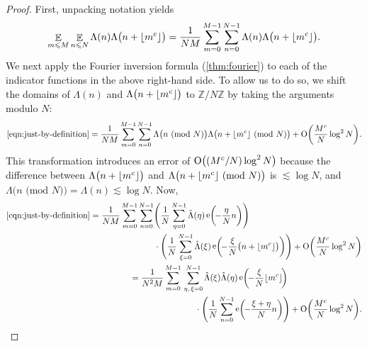 \documentclass[letterpaper, 12pt]{article}
\theoremstyle{plain}
\theoremstyle{definition}
\theoremstyle{plain}
\theoremstyle{plain}
\numberwithin{equation}{section}
\newcommand{\Oh}{{\rm O}}
\newcommand{\Z}{\mathbb{Z}}
\renewcommand{\leq}{\leqslant}
\newcommand{\E}{\mathbb{E}}
\newcommand{\1}{\textbf{1}}
\DeclarePairedDelimiter\floor{\lfloor}{\rfloor}
\DeclareMathOperator{\e}{e}
\begin{document}
\begin{proof} First, unpacking notation yields
    \begin{equation}\label{eqn:just-by-definition}
        \mathop{\E}_{m \leq M} \mathop{\E}_{n \leq N} \Lambda(n) \Lambda\bigl(n + \floor{m^c} \bigr)
        = \frac{1}{NM} \sum_{m = 0}^{M - 1} \sum_{n = 0}^{N - 1} \Lambda(n) \Lambda\bigl(n + \floor{m^c} \bigr).
    \end{equation}
        We next apply the Fourier inversion formula (\cref{thm:fourier}) to each of the indicator functions in the above right-hand side. To allow us to do so, we shift the domains of \(\Lambda(n)\) and \(\Lambda\bigl(n + \floor{m^c} \bigr)\) to \(\Z/N\Z\) by taking the arguments modulo \(N\):
    \begin{equation*}
        \eqref{eqn:just-by-definition} = \frac{1}{NM} \sum_{m = 0}^{M - 1} \sum_{n = 0}^{N - 1} \Lambda\bigl(n \text{ (mod } N) \bigr) \Lambda\bigl(n + \floor{m^c} \text{ (mod } N)\bigr) + \Oh \biggl(\frac{M^c}{N} \log^2{N} \biggr).
    \end{equation*}
    This transformation introduces an error of \(\Oh \bigl((M^c/N)\log^2{N} \bigr)\) because the difference between \(\Lambda\bigl(n + \floor{m^c} \bigr)\) and \(\Lambda\bigl(n + \floor{m^c} \text{ (mod } N) \bigr)\) is $\lesssim \log N$, and $\Lambda\bigl(n\text{ (mod } N) \bigr) = \Lambda(n) \lesssim \log N$.
    Now,
    \begin{align*}
        \begin{split}
            \eqref{eqn:just-by-definition} &= \frac{1}{NM} \sum_{m = 0}^{M - 1} \sum_{n = 0}^{N - 1} \Biggl(\frac{1}{N} \sum_{\eta = 0}^{N - 1} \hat{\Lambda}(\eta) \e\biggl(\! -\frac{\eta}{N} n \biggr) \Biggr)\\
            &\hphantom{= \frac{1}{NM} \sum_{m = 0}^{M - 1} \sum_{n = 0}^{N - 1}}\ 
            \cdot \Biggl(\frac{1}{N} \sum_{\xi = 0}^{N - 1} \hat{\Lambda}(\xi) \e\biggl(\! -\frac{\xi}{N} \bigl(n + \floor{m^c} \bigr) \biggr) \Biggr) + \Oh \biggl(\frac{M^c}{N}\log^2{N} \biggr)
        \end{split}\\
        \begin{split}
            &= \frac{1}{N^2M} \sum_{m = 0}^{M - 1} \, \sum_{\eta,\, \xi = 0}^{N - 1} \hat{\Lambda}(\xi)\hat{\Lambda}(\eta) \e\biggl(\! -\frac{\xi}{N} \floor{m^c} \!\biggr)\\
            &\hphantom{= \frac{1}{NM} \sum_{m = 0}^{M - 1} \, \sum_{n = 0}^{N - 1}}\ 
            \cdot \Biggl(\frac{1}{N} \sum_{n = 0}^{N - 1} \e\biggl(\! -\frac{\xi + \eta}{N} n \biggr)\Biggr) + \Oh \biggl(\frac{M^c}{N}\log^2{N} \biggr).

\end{split}
\end{align*}
\end{proof}
\end{document}
